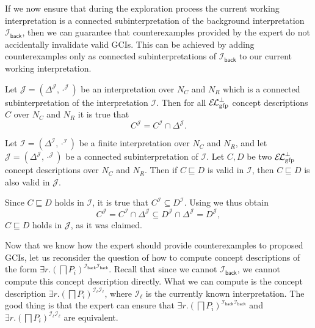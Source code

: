 If we now ensure that during the exploration process the current working interpretation is
a connected subinterpretation of the background interpretation
$\mathcal{I}_{\mathsf{back}}$, then we can guarantee that counterexamples provided by the
expert do not accidentally invalidate valid GCIs.  This can be achieved by adding
counterexamples only as connected subinterpretations of $\mathcal{I}_{\mathsf{back}}$ to
our current working interpretation.

\begin{Lemma}
  \label{lem:Felix-6.12}
  Let $\mathcal{J} = (\Delta^{\mathcal{J}}, \cdot^{\mathcal{J}})$ be an interpretation
  over $N_{C}$ and $N_{R}$ which is a connected subinterpretation of the interpretation
  $\mathcal{I}$.  Then for all $\ELgfpbot$ concept descriptions $C$ over $N_{C}$ and
  $N_{R}$ it is true that
  \begin{equation*}
    C^{\mathcal{J}} = C^{\mathcal{I}} \cap \Delta^{\mathcal{J}}.
  \end{equation*}
\end{Lemma}

\begin{Theorem}
  \label{thm:GCIs-valid-in-interpretations-are-also-valid-in-connected-subinterpretations}
  Let $\mathcal{I} = (\Delta^{\mathcal{I}}, \cdot^{\mathcal{I}})$ be a finite
  interpretation over $N_{C}$ and $N_{R}$, and let $\mathcal{J} = (\Delta^{\mathcal{J}},
  \cdot^{\mathcal{J}})$ be a connected subinterpretation of $\mathcal{I}$.  Let $C, D$ be
  two $\ELgfpbot$ concept descriptions over $N_{C}$ and $N_{R}$.  Then if $C \sqsubseteq
  D$ is valid in $\mathcal{I}$, then $C \sqsubseteq D$ is also valid in $\mathcal{J}$.
\end{Theorem}
\begin{Proof}
  Since $C \sqsubseteq D$ holds in $\mathcal{I}$, it is true that $C^{\mathcal{I}}
  \subseteq D^{\mathcal{I}}$.  Using  we thus obtain
  \begin{equation*}
    C^{\mathcal{J}} = C^{\mathcal{I}} \cap \Delta^{\mathcal{J}} \subseteq D^{\mathcal{J}}
    \cap \Delta^{\mathcal{J}} = D^{\mathcal{J}},
  \end{equation*}
  \ie $C \sqsubseteq D$ holds in $\mathcal{J}$, as it was claimed.
\end{Proof}

Now that we know how the expert should provide counterexamples to proposed GCIs, let us
reconsider the question of how to compute concept descriptions of the form $\exists
r. (\bigsqcap P_{i})^{\mathcal{I}_{\mathsf{back}}\mathcal{I}_{\mathsf{back}}}$.  Recall
that since we cannot $\mathcal{I}_{\mathsf{back}}$, we cannot compute this concept
description directly.  What we can compute is the concept description $\exists
r. (\bigsqcap P_{i})^{\mathcal{I}_{\ell}\mathcal{I}_{\ell}}$, where $\mathcal{I}_{\ell}$
is the currently known interpretation.  The good thing is that the expert can ensure that
$\exists r. (\bigsqcap P_{i})^{\mathcal{I}_{\mathsf{back}}\mathcal{I}_{\mathsf{back}}}$
and $\exists r. (\bigsqcap P_{i})^{\mathcal{I}_{\ell}\mathcal{I}_{\ell}}$ are equivalent.

